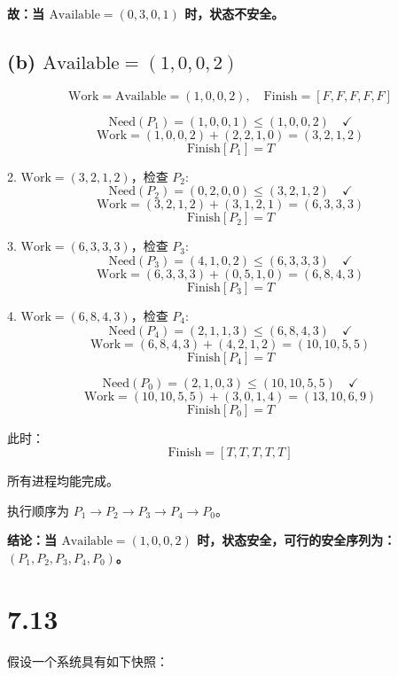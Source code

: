 \documentclass[UTF8]{homework}
\begin{document}
\begin{homeworkProblem}
\textbf{故：当 $\text{Available}=(0,3,0,1)$ 时，状态不安全。}

\subsection*{(b) $\text{Available} = (1,0,0,2)$}

\[
\text{Work} = \text{Available} = (1,0,0,2),\quad \text{Finish}=[F,F,F,F,F]
\]

   
   \[
   \text{Need}(P_1)=(1,0,0,1) \leq (1,0,0,2) \quad \checkmark
   \]
   \[
   \text{Work} = (1,0,0,2)+(2,2,1,0) = (3,2,1,2)
   \]
   \[
   \text{Finish}[P_1]=T
   \]

2. $\text{Work}=(3,2,1,2)$，检查 $P_2$:
   \[
   \text{Need}(P_2)=(0,2,0,0) \leq (3,2,1,2) \quad \checkmark
   \]
   \[
   \text{Work}=(3,2,1,2)+(3,1,2,1)=(6,3,3,3)
   \]
   \[
   \text{Finish}[P_2]=T
   \]

3. $\text{Work}=(6,3,3,3)$，检查 $P_3$:
   \[
   \text{Need}(P_3)=(4,1,0,2) \leq (6,3,3,3) \quad \checkmark
   \]
   \[
   \text{Work}=(6,3,3,3)+(0,5,1,0)=(6,8,4,3)
   \]
   \[
   \text{Finish}[P_3]=T
   \]

4. $\text{Work}=(6,8,4,3)$，检查 $P_4$:
   \[
   \text{Need}(P_4)=(2,1,1,3) \leq (6,8,4,3) \quad \checkmark
   \]
   \[
   \text{Work}=(6,8,4,3)+(4,2,1,2)=(10,10,5,5)
   \]
   \[
   \text{Finish}[P_4]=T
   \]

   \[
   \text{Need}(P_0)=(2,1,0,3) \leq (10,10,5,5) \quad \checkmark
   \]
   \[
   \text{Work}=(10,10,5,5)+(3,0,1,4)=(13,10,6,9)
   \]
   \[
   \text{Finish}[P_0]=T
   \]

此时：
\[
\text{Finish}=[T,T,T,T,T]
\]

所有进程均能完成。

执行顺序为 $P_1 \rightarrow P_2 \rightarrow P_3 \rightarrow P_4 \rightarrow P_0$。

\textbf{结论：当 $\text{Available}=(1,0,0,2)$ 时，状态安全，可行的安全序列为：$(P_1, P_2, P_3, P_4, P_0)$。}


\section{7.13}

假设一个系统具有如下快照：


\end{homeworkProblem}
\end{document}
